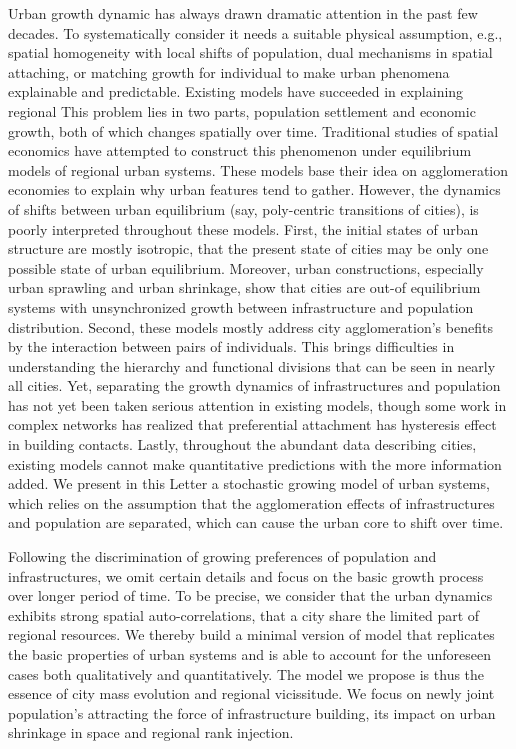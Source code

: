 \documentclass[reprint,unsortedaddress,amsmath,amssymb,floatfix,aps,prl,showkeys]{revtex4-2}
\begin{document}
Urban growth dynamic has always drawn dramatic attention in the past few decades. To systematically consider it needs a suitable physical assumption, e.g., spatial homogeneity with local shifts of population\cite{PhysRevLett.79.523}, dual mechanisms in spatial attaching\cite{PhysRevX.4.011008}, or matching growth for individual\cite{Li2017Simple} to make urban phenomena explainable and predictable. Existing models have succeeded in explaining regional  This problem lies in two parts, population settlement and economic growth, both of which changes spatially over time. Traditional studies of spatial economics have attempted to construct this phenomenon under equilibrium models of regional urban systems\cite{batty1992form}. These models base their idea on agglomeration economies to explain why urban features tend to gather. However, the dynamics of shifts between urban equilibrium (say, poly-centric transitions of cities), is poorly interpreted throughout these models. First, the initial states of urban structure are mostly isotropic, that the present state of cities may be only one possible state of urban equilibrium. Moreover, urban constructions, especially urban sprawling and urban shrinkage, show that cities are out-of equilibrium systems with unsynchronized growth between infrastructure and population distribution. Second, these models mostly address city agglomeration's benefits by the interaction between pairs of individuals. This brings difficulties in understanding the hierarchy and functional divisions that can be seen in nearly all cities. Yet, separating the growth dynamics of infrastructures and population has not yet been taken serious attention in existing models, though some work in complex networks has realized that preferential attachment has hysteresis effect in building contacts. Lastly, throughout the abundant data describing cities, existing models cannot make quantitative predictions with the more information added. We present in this Letter a stochastic growing model of urban systems, which relies on the assumption that the agglomeration effects of infrastructures and population are separated, which can cause the urban core to shift over time. 


Following the discrimination of growing preferences of population and infrastructures, we omit certain details and focus on the basic growth process over longer period of time. To be precise, we consider that the urban dynamics exhibits strong spatial auto-correlations, that a city share the limited part of regional resources. We thereby build a minimal version of model that replicates the basic properties of urban systems and is able to account for the unforeseen cases both qualitatively and quantitatively. The model we propose is thus the essence of  city mass evolution and regional vicissitude. We focus on newly joint population's attracting the force of infrastructure building, its impact on urban shrinkage in space and regional rank injection. 
\end{document}
